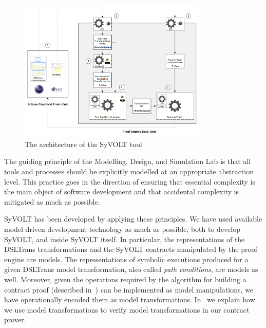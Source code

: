 \begin{figure}
\centering
\includegraphics[width=0.8\textwidth]{figures/syvolt_arch}
\caption{The architecture of the SyVOLT tool}
\label{fig:arch}
\end{figure}

The guiding principle of the Modelling, Design, and Simulation Lab is that all tools and processes should be
explicitly modelled at an appropriate abstraction level. This
practice goes in the direction of ensuring that essential complexity is the main
object of software development and that accidental complexity is mitigated as
much as possible.

SyVOLT has been developed by applying these principles. We have used available
model-driven development technology as much as possible, both to develop SyVOLT,
and inside SyVOLT itself. In particular, the representations of the DSLTrans
transformations and the SyVOLT contracts manipulated by the proof engine are
models. The representations of symbolic executions produced for a given DSLTrans
model transformation, also called \emph{path conditions}, are models as well.
Moreover, given the operations required by the algorithm for building a contract
proof (described in~\cite{Lucio2014}) can be implemented as model manipulations,
we have operationally encoded them as model transformations.
In~\cite{LucioVang} we explain how we use model transformations to
verify model transformations in our contract prover.

